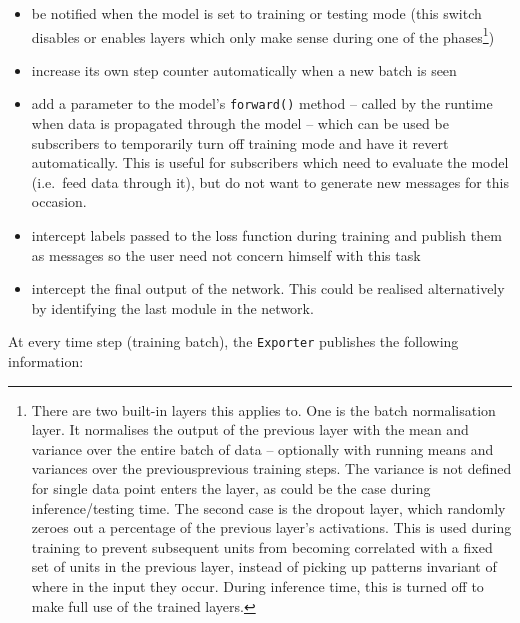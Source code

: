 \begin{itemize}
    \item
        be notified when the model is set to training or testing mode (this
        switch disables or enables layers which only make sense during one of
        the phases\footnote{There are two built-in layers this applies to. One
            is the batch normalisation layer. It normalises the output of the
            previous layer with the mean and variance over the entire batch of
            data -- optionally with running means and variances over the
            previousprevious training steps. The variance is not defined for
            single data point enters the layer, as could be the case during
            inference/testing time. The second case is the dropout layer, which
            randomly zeroes out a percentage of the previous layer's
            activations. This is used during training to prevent subsequent
            units from becoming correlated with a fixed set of units in the
            previous layer, instead of picking up patterns invariant of where in
            the input they occur. During inference time, this is turned off to
            make full use of the trained
        layers.})
    \item
        increase its own step counter automatically when a new batch is seen
    \item
        add a parameter to the model's \lstinline{forward()} method -- called by
        the runtime when data is propagated through the model -- which can be
        used be subscribers to temporarily turn off training mode and have it
        revert automatically. This is useful for subscribers which need to
        evaluate the model (i.e.~feed data through it), but do not want to
        generate new messages for this occasion.
    \item
        intercept labels passed to the loss function during training and
        publish them as messages so the user need not concern himself with
        this task
    \item
        intercept the final output of the network. This could be realised
        alternatively by identifying the last module in the network.
\end{itemize}

At every time step (training batch), the \texttt{Exporter} publishes the
following information:


